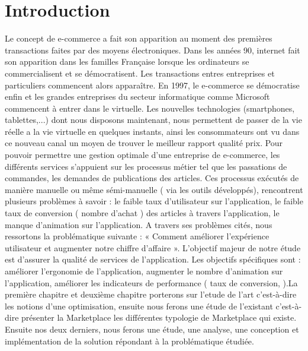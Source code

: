 \chapter*{Introduction}                      %
\thispagestyle{fancy}
\vspace{-2cm}

Le concept de e-commerce a fait son apparition au moment des premières transactions faites par des moyens électroniques. Dans les années 90, internet fait son apparition dans les familles Française lorsque les ordinateurs se commercialisent et se démocratisent. Les transactions entres entreprises et particuliers  commencent alors apparaître. En 1997, le e-commerce se démocratise enfin et les grandes entreprises du secteur informatique comme Microsoft commencent à entrer dans le virtuelle. Les nouvelles technologies (smartphones, tablettes,...) dont nous disposons maintenant, nous permettent de passer de la vie réelle a la vie virtuelle en quelques instants, ainsi les consommateurs ont vu dans ce nouveau canal un moyen de trouver le meilleur rapport qualité prix. Pour pouvoir permettre une gestion optimale d’une entreprise de e-commerce, les différents services s’appuient sur les processus métier tel que les passations de commandes, les demandes de publications des articles. Ces processus exécutés de manière manuelle ou même sémi-manuelle ( via les outils développés), rencontrent plusieurs problèmes à savoir : le faible taux d’utilisateur sur l’application, le faible taux de conversion ( nombre d’achat ) des articles à travers l’application, le manque d’animation sur l’application. A travers ses problèmes cités, nous ressortons la problématique suivante : « Comment améliorer l’expérience utilisateur et augmenter notre chiffre d’affaire ». L’objectif majeur de notre étude est d’assurer la qualité de services de l’application. Les objectifs spécifiques sont : améliorer l’ergonomie de l’application, augmenter le nombre d’animation sur l’application, améliorer les indicateurs de performance ( taux de conversion, ).La première chapitre et deuxième chapitre porterons sur l'etude de l'art c’est-à-dire les notions d'une optimisation, ensuite nous ferons une étude de l’existant c’est-à-dire présenter la Marketplace les différentes typologie de Marketplace qui existe. Ensuite nos deux derniers, nous ferons une étude, une analyse, une conception et implémentation de la solution répondant à la problématique étudiée.\\
